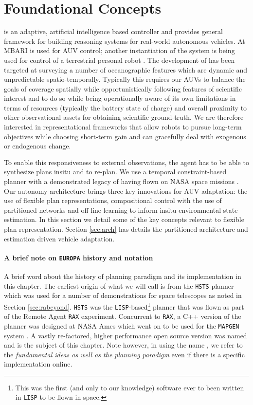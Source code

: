 \section{Foundational Concepts}
\label{sec:concepts}

\rx is an adaptive, artificial intelligence based controller and
provides general framework for building reasoning systems for
real-world autonomous vehicles. At MBARI \rx is used for AUV control;
another instantiation of the system is being used for control of a
terrestrial personal robot \cite{pr2, Meeussen:2010dn}. The
development of \rx has been targeted at surveying a number of
oceanographic features which are dynamic and unpredictable
spatio-temporally. Typically this requires our AUVs to balance the
goals of coverage spatially while opportunistically following features
of scientific interest and to do so while being operationally aware of
its own limitations in terms of resources (typically the battery state
of charge) and overall proximity to other observational assets for
obtaining scientific ground-truth. We are therefore interested in
representational frameworks that allow robots to pursue long-term
objectives while choosing short-term gain and can gracefully deal with
exogenous or endogenous change.

To enable this responsiveness to external observations, the agent has
to be able to synthesize plans insitu and to re-plan. We use a
temporal constraint-based planner \eu with a demonstrated legacy of
having flown on NASA space missions \cite{jonsson00,bresina05,
  barreiro09}. Our autonomy architecture brings three key innovations
for AUV adaptation: the use of flexible plan representations,
compositional control with the use of partitioned networks and
off-line learning to inform insitu environmental state estimation. In
this section we detail some of the key concepts relevant to flexible
plan representation. Section \ref{sec:arch} has details the
\rx partitioned architecture and estimation driven vehicle
adaptation.

\paragraph {A brief note on \texttt{EUROPA} history and notation} A
brief word about the history of planning paradigm and its
implementation in this chapter. The earliest origin of what we will
call \eu is from the \texttt{HSTS} planner \cite{mus94} which was used
for a number of demonstrations for space telescopes as noted in
Section \ref{sec:rabeyond}. \texttt{HSTS} was the
\texttt{LISP}-based\footnote{This was the first (and only to our
  knowledge) software ever to been written in \texttt{LISP} to be
  flown in space.} planner that was flown as part of the Remote Agent
\texttt{RAX} experiment. Concurrent to \texttt{RAX}, a C++ version of
the planner was designed at NASA Ames which went on to be used for the
\texttt{MAPGEN} system \cite{bresina05}. A vastly re-factored, higher
performance open source version \cite{europapso} was named \eu and is
the subject of this chapter. Note however, in using the name \eu, we
refer to the \emph{fundamental ideas as well as the planning paradigm}
even if there is a specific implementation online.


